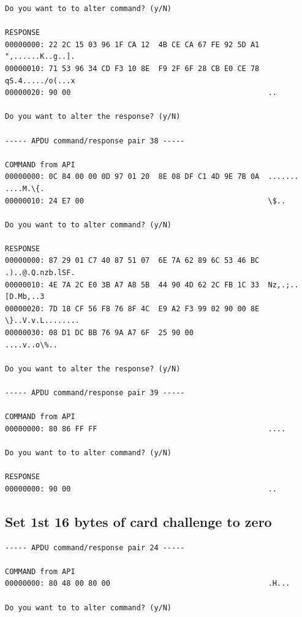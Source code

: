 \documentclass[bsc,frontabs,twoside,singlespacing,parskip,deptreport]{infthesis}     %
\begin{document}
\begin{appendices}
\begin{Verbatim}[commandchars=\\\{\}, fontsize=\small]
Do you want to to alter command? (y/N)

RESPONSE
00000000: 22 2C 15 03 96 1F CA 12  4B CE CA 67 FE 92 5D A1  ",......K..g..].
00000010: 71 53 96 34 CD F3 10 8E  F9 2F 6F 28 CB E0 CE 78  qS.4...../o(...x
00000020: 90 00                                             ..

Do you want to alter the response? (y/N)

----- APDU command/response pair 38 -----

COMMAND from API
00000000: 0C 84 00 00 0D 97 01 20  8E 08 DF C1 4D 9E 7B 0A  ....... ....M.\{.
00000010: 24 E7 00                                          \$..

Do you want to to alter command? (y/N)

RESPONSE
00000000: 87 29 01 C7 40 87 51 07  6E 7A 62 89 6C 53 46 BC  .)..@.Q.nzb.lSF.
00000010: 4E 7A 2C E0 3B A7 A8 5B  44 90 4D 62 2C FB 1C 33  Nz,.;..[D.Mb,..3
00000020: 7D 18 CF 56 F8 76 8F 4C  E9 A2 F3 99 02 90 00 8E  \}..V.v.L........
00000030: 08 D1 DC BB 76 9A A7 6F  25 90 00                 ....v..o\%..

Do you want to alter the response? (y/N)

----- APDU command/response pair 39 -----

COMMAND from API
00000000: 80 86 FF FF                                       ....

Do you want to to alter command? (y/N)

RESPONSE
00000000: 90 00                                             ..
\end{Verbatim}

\subsection{Set 1st 16 bytes of card challenge to zero}
\begin{Verbatim}[commandchars=\\\{\}, fontsize=\small]
----- APDU command/response pair 24 -----

COMMAND from API
00000000: 80 48 00 80 00                                    .H...

Do you want to to alter command? (y/N)


\end{Verbatim}
\end{appendices}
\end{document}
